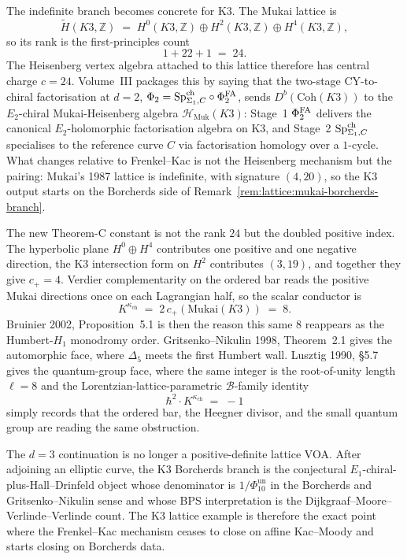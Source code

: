 \begin{example}
\label{ex:lattice:mukai-phi2-k3}
The indefinite branch becomes concrete for K3. The Mukai lattice is
\[
 \widetilde H(K3,\mathbb{Z})
 \;=\;
 H^0(K3,\mathbb{Z}) \oplus H^2(K3,\mathbb{Z}) \oplus H^4(K3,\mathbb{Z}),
\]
so its rank is the first-principles count
\[
 1 + 22 + 1 \;=\; 24.
\]
The Heisenberg vertex algebra attached to this lattice therefore has
central charge $c = 24$. Volume~III packages this by saying that the
two-stage CY-to-chiral factorisation at $d=2$,
$\Phi_2 = \mathrm{Sp}^{\mathrm{ch}}_{\Sigma_1, C} \circ \Phi^{\mathrm{FA}}_2$,
sends $D^b(\mathrm{Coh}(K3))$ to the
$E_2$-chiral Mukai-Heisenberg algebra
$\mathcal{H}_{\mathrm{Muk}}(K3)$: Stage~1 $\Phi^{\mathrm{FA}}_2$ delivers the
canonical $E_2$-holomorphic factorisation algebra on K3, and
Stage~2 $\mathrm{Sp}^{\mathrm{ch}}_{\Sigma_1, C}$ specialises to the reference curve $C$
via factorisation homology over a $1$-cycle.
What changes relative to
Frenkel--Kac is not the Heisenberg mechanism but the pairing: Mukai's
1987 lattice is indefinite, with signature $(4,20)$, so the K3 output
starts on the Borcherds side of
Remark~\ref{rem:lattice:mukai-borcherds-branch}.

The new Theorem-C constant is not the rank $24$ but the doubled
positive index. The hyperbolic plane $H^0 \oplus H^4$ contributes one
positive and one negative direction, the K3 intersection form on $H^2$
contributes $(3,19)$, and together they give $c_+=4$. Verdier
complementarity on the ordered bar reads the positive Mukai directions
once on each Lagrangian half, so the scalar conductor is
\[
 K^{\kappa_{\mathrm{ch}}}
 \;=\;
 2\,c_+(\mathrm{Mukai}(K3))
 \;=\;
 8.
\]
Bruinier 2002, Proposition~5.1 is then the reason this same $8$
reappears as the Humbert-$H_1$ monodromy order. Gritsenko--Nikulin
1998, Theorem~2.1 gives the automorphic face, where $\Delta_5$ meets
the first Humbert wall. Lusztig 1990, \S5.7 gives the quantum-group
face, where the same integer is the root-of-unity length $\ell=8$ and
the Lorentzian-lattice-parametric $\mathcal{B}$-family identity
\[
 \hbar^2\!\cdot\!K^{\kappa_{\mathrm{ch}}} \;=\; -1
\]
simply records that the ordered bar, the Heegner divisor, and the small
quantum group are reading the same obstruction.

The $d=3$ continuation is no longer a positive-definite lattice VOA.
After adjoining an elliptic curve, the K3 Borcherds branch is the
conjectural $E_1$-chiral-plus-Hall--Drinfeld object whose denominator
is $1/\Phi_{10}^{\mathrm{un}}$ in the Borcherds and
Gritsenko--Nikulin sense and
whose BPS interpretation is the Dijkgraaf--Moore--Verlinde--Verlinde
count. The K3 lattice example is therefore the exact point where the
Frenkel--Kac mechanism ceases to close on affine Kac--Moody and starts
closing on Borcherds data.
\end{example}

